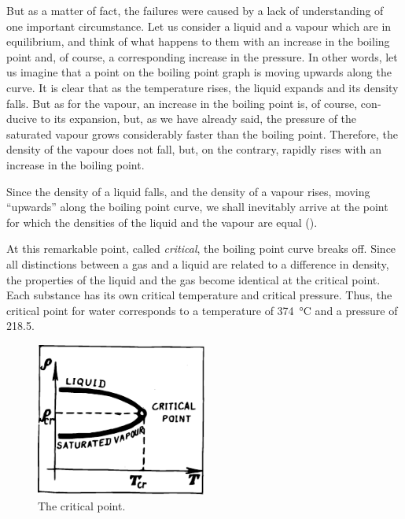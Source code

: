 But as a matter of fact, the failures were caused by a lack of understanding of one important circumstance. Let us consider a liquid and a vapour which are in equi­librium, and think of what happens to them with an increase in the boiling point and, of course, a corresponding increase in the pressure. In other words, let us imagine that a point on the boiling point graph is moving upwards along the curve. It is clear that as the temperature rises, the liquid expands and its density falls. But as for the vapour, an increase in the boiling point is, of course, con­ducive to its expansion, but, as we have already said, the pressure of the saturated vapour grows considerably faster than the boiling point. 
Therefore, the density of the vapour does not fall, but, on the contrary, rapidly rises with an increase in the boiling point.

Since the density of a liquid falls, and the density of a vapour rises, moving ``upwards'' along the boiling point curve, we shall inevitably arrive at the point for which the densities of the liquid and the vapour are equal ().

At this remarkable point, called \emph{critical}, the boiling point curve breaks off. Since all distinctions between a gas and a liquid are related to a difference in density, the properties of the liquid and the gas become identical at the critical point. Each substance has its own critical temperature and critical pressure. Thus, the critical point for water corresponds to a temperature of \SI{374}{\celsius} and a pressure of \SI{218.5}{\atmos}.
\begin{figure}[!ht]
\centering
\includegraphics[width=0.5\textwidth]{figures/fig-04-03.pdf}
\caption{The critical point.}
\label{fig-4.3}
\end{figure}

